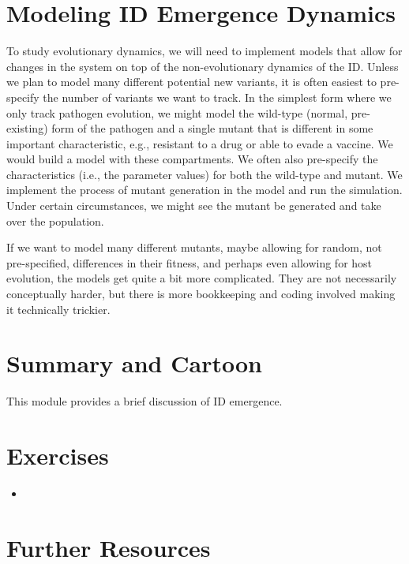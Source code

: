 \documentclass[]{book}
\theoremstyle{definition}
\theoremstyle{definition}
\theoremstyle{definition}
\theoremstyle{remark}
\begin{document}
\section{Modeling ID Emergence
Dynamics}\label{modeling-id-emergence-dynamics}

To study evolutionary dynamics, we will need to implement models that
allow for changes in the system on top of the non-evolutionary dynamics
of the ID. Unless we plan to model many different potential new
variants, it is often easiest to pre-specify the number of variants we
want to track. In the simplest form where we only track pathogen
evolution, we might model the wild-type (normal, pre-existing) form of
the pathogen and a single mutant that is different in some important
characteristic, e.g., resistant to a drug or able to evade a vaccine. We
would build a model with these compartments. We often also pre-specify
the characteristics (i.e., the parameter values) for both the wild-type
and mutant. We implement the process of mutant generation in the model
and run the simulation. Under certain circumstances, we might see the
mutant be generated and take over the population.

If we want to model many different mutants, maybe allowing for random,
not pre-specified, differences in their fitness, and perhaps even
allowing for host evolution, the models get quite a bit more
complicated. They are not necessarily conceptually harder, but there is
more bookkeeping and coding involved making it technically trickier.

\section{Summary and Cartoon}\label{summary-and-cartoon-14}

This module provides a brief discussion of ID emergence.

\section{Exercises}\label{exercises-14}

\begin{itemize}
\item
\end{itemize}

\section{Further Resources}\label{further-resources-14}
\end{document}
